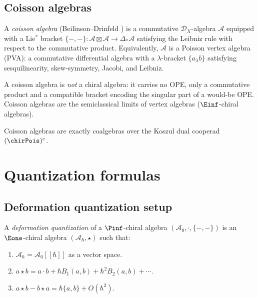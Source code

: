 \subsection{Coisson algebras}

\begin{definition}\label{def:coisson}
A \emph{coisson algebra} (Beilinson--Drinfeld \cite{BD04}) is a commutative
$\mathcal{D}_X$-algebra $\mathcal{A}$ equipped with a Lie$^*$ bracket
$\{-,-\}\colon \mathcal{A} \boxtimes \mathcal{A} \to \Delta_* \mathcal{A}$
satisfying the Leibniz rule with respect to the commutative product.
Equivalently, $\mathcal{A}$ is a Poisson vertex algebra (PVA): a commutative
differential algebra with a $\lambda$-bracket $\{a_\lambda b\}$ satisfying
sesquilinearity, skew-symmetry, Jacobi, and Leibniz.

A coisson algebra is \emph{not} a chiral algebra: it carries no OPE, only a
commutative product and a compatible bracket encoding the singular part of a
would-be OPE. Coisson algebras are the semiclassical limits of vertex algebras
($\Einf$-chiral algebras).
\end{definition}


\begin{theorem}[Coisson = \texorpdfstring{$(\chirPois)^c$}{(chirPois)c}-coalgebra; \ClaimStatusProvedElsewhere{} \cite{BD04}]\label{thm:coisson-coalgebra}
Coisson algebras are exactly coalgebras over the Koszul dual cooperad $(\chirPois)^c$.
\end{theorem}


\section{Quantization formulas}
\label{sec:quantization-formulas}

\subsection{Deformation quantization setup}

\begin{construction}\label{constr:quantization}
A \emph{deformation quantization} of a $\Pinf$-chiral
algebra $(\mathcal{A}_0, \cdot, \{-,-\})$ is an
$\Eone$-chiral algebra $(\mathcal{A}_\hbar, \star)$ such
that:
\begin{enumerate}[label=(\roman*)]
\item $\mathcal{A}_\hbar = \mathcal{A}_0[[\hbar]]$ as a vector space.
\item $a \star b = a \cdot b + \hbar B_1(a, b) + \hbar^2 B_2(a, b) + \cdots$.
\item $a \star b - b \star a = \hbar \{a, b\} + O(\hbar^2)$.
\end{enumerate}
\end{construction}


